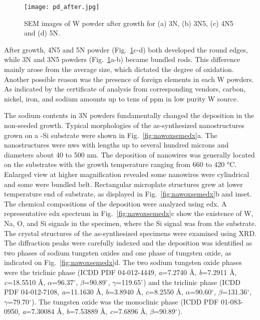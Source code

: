 \begin{figure}[htb]
\centering
\texttt{[image: pd\_after.jpg]}
\caption[SEM images of W powder after growth]{SEM images of W powder after growth for (a) 3N, (b) 3N5, (c) 4N5 and (d) 5N. }
\label{fig:pdafter}
\end{figure}
After growth, 4N5 and 5N powder (Fig.~\ref{fig:pdafter}c-d) both developed the round edges, while 3N and 3N5 powders (Fig.~\ref{fig:pdafter}a-b) became bundled rods. This difference mainly arose from the average size, which dictated the degree of oxidation. Another possible reason was the presence of foreign elements in each W powders. As indicated by the certificate of analysis from corresponding vendors, carbon, nickel, iron, and sodium amounts up to tens of ppm in low purity W source. 

The sodium contents in 3N powders fundamentally changed the deposition in the non-seeded growth. Typical morphologies of the as-synthesized nanostructures grown on a -Si substrate were shown in Fig.~\ref{fig:nawoxsemedx}a. The nanostructures were \glspl{nw} with lengths up to several hundred microns and diameters about 40 to 500 nm. The deposition of nanowires was generally located on the substrates with the growth temperature ranging from 660 to 420 \si{\degreeCelsius}. Enlarged view at higher magnification revealed some nanowires were cylindrical and some were bundled belt. Rectangular microplate structures grew at lower temperature end of substrate, as displayed in Fig.~\ref{fig:nawoxsemedx}b and inset. The chemical compositions of the deposition were analyzed using \gls{edx}. A representative \gls{edx} spectrum in Fig.~\ref{fig:nawoxsemedx}c show the existence of W, Na, O, and Si signals in the specimen, where the Si signal was from the substrate. The crystal structures of the as-synthesized specimens were examined using XRD. The diffraction peaks were carefully indexed and the deposition was identified as two phases of sodium tungsten oxides and one phase of tungsten oxide, as indicated on Fig.~\ref{fig:nawoxsemedx}d. The two sodium tungsten oxide phases were the triclinic  phase (ICDD PDF 04-012-4449, \emph{a}=7.2740 \si{\angstrom}, \emph{b}=7.2911 \si{\angstrom}, \emph{c}=18.5510 \si{\angstrom}, $\alpha$=96.37$^\circ$, $\beta$=90.89$^\circ$, $\gamma$=119.65$^\circ$) and the triclinic  phase (ICDD PDF 04-012-7108, \emph{a}=11.1630 \si{\angstrom}, \emph{b}=3.8940 \si{\angstrom}, \emph{c}=8.2550 \si{\angstrom}, $\alpha$=90.60$^\circ$, $\beta$=131.36$^\circ$, $\gamma$=79.70$^\circ$). The tungsten oxide was the monoclinic  phase (ICDD PDF 01-083-0950, \emph{a}=7.30084 \si{\angstrom}, \emph{b}=7.53889 \si{\angstrom}, \emph{c}=7.6896 \si{\angstrom}, $\beta$=90.89$^\circ$).

